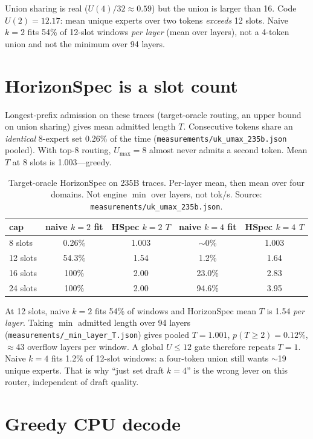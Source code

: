 \documentclass[11pt]{article}
\begin{document}
Union sharing is real ($U(4)/32\approx 0.59$) but the union is larger than 16.
Code $U(2)=12.17$: mean unique experts over two tokens \emph{exceeds} 12
slots. Naive $k{=}2$ fits 54\% of 12-slot windows \emph{per layer} (mean over
layers), not a 4-token union and not the minimum over 94 layers.

\section{HorizonSpec is a slot count}
\label{sec:hs}

Longest-prefix admission on these traces (target-oracle routing, an upper
bound on union sharing) gives mean admitted length $T$. Consecutive tokens
share an \emph{identical} 8-expert set 0.26\% of the time
(\texttt{measurements/uk\_umax\_235b.json} pooled). With top-8 routing,
$U_{\max}{=}8$ almost never admits a second token. Mean $T$ at 8 slots is
1.003---greedy.

\begin{table}[t]\centering
\caption{Target-oracle HorizonSpec on 235B traces. Per-layer mean, then mean
over four domains. Not engine $\min$ over layers, not tok/s.
Source: \texttt{measurements/uk\_umax\_235b.json}.}
\label{tab:hs}
\small
\begin{tabular}{lcccc}
\toprule
cap & naive $k{=}2$ fit & HSpec $k{=}2$ $T$ & naive $k{=}4$ fit & HSpec $k{=}4$ $T$ \\
\midrule
8 slots  & 0.26\% & 1.003 & $\sim$0\% & 1.003 \\
12 slots & 54.3\% & 1.54  & 1.2\% & 1.64 \\
16 slots & 100\%  & 2.00  & 23.0\% & 2.83 \\
24 slots & 100\%  & 2.00  & 94.6\% & 3.95 \\
\bottomrule
\end{tabular}
\end{table}

At 12 slots, naive $k{=}2$ fits 54\% of windows and HorizonSpec mean $T$ is
1.54 \emph{per layer}. Taking $\min$ admitted length over 94 layers
(\texttt{measurements/\_min\_layer\_T.json}) gives pooled $T{=}1.001$,
$p(T{\ge}2){=}0.12\%$, $\approx$43 overflow layers per window. A global
$U{\le}12$ gate therefore repeats $T{=}1$. Naive $k{=}4$ fits 1.2\% of 12-slot
windows: a four-token union still wants $\sim$19 unique experts. That is why
``just set draft $k{=}4$'' is the wrong lever on this router, independent of
draft quality.

\section{Greedy CPU decode}
\label{sec:decode}
\end{document}

